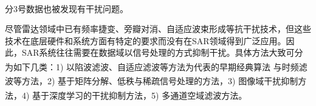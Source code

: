 \documentclass[10.5pt,UTF8]{JR}
\theoremstyle{mystyle}
\newcommand{\upcite}[1]{\textsuperscript{\cite{#1}}}
\begin{document}
\noindent 分3号数据也被发现有干扰问题\upcite{yang2021bsf,liObservationMitigationMutual2022a}。


尽管雷达领域中已有频率捷变、旁瓣对消、自适应波束形成等抗干扰技术，但这些技术在底层硬件和系统方面有特定的要求而没有在SAR领域得到广泛应用。因此，SAR系统往往需要在数据域以信号处理的方式抑制干扰。具体方法大致可分为如下几类：1) 以陷波滤波、自适应滤波等方法为代表的早期经典算法\upcite{1995Interference,lord1998approaches,potsis1999phase,wang2002hc} 与时频滤波等方法\upcite{zhang2011interference,li2015efficient}，2) 基于矩阵分解、低秩与稀疏信号处理的方法\upcite{zhouEigensubspacebasedFilteringApplication2007a,Nguyen2012Robust,Huang2019eff,huang2020hc,yang2020dictionary}，3) 图像域干扰抑制方法\upcite{yang2020mutual,yang2021bsf,yang2021two,yang2024robust}，4) 基于深度学习的干扰抑制方法\upcite{fan2019interference,wei2022carnet,nie2024jy}，5) 多通道空域滤波方法\upcite{ma2007zs,li2008yz,meng2018qs,zhangsx2014thesis,bollian2019adaptive}。
\end{document}
